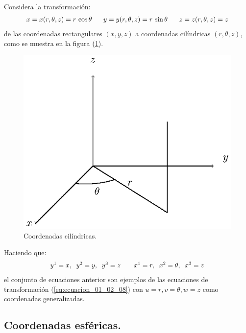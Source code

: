 \documentclass[hidelinks,12pt]{article}
\begin{document}
Considera la transformación:
\begin{align*}
x = x (r, \theta, z) = r \, \cos \theta \hspace{0.6cm} y = y (r, \theta, z) = r \, \sin \theta \hspace{0.6cm} z = z (r, \theta, z) = z
\end{align*}
de las coordenadas rectangulares $(x, y, z)$ a coordenadas cilíndricas $(r, \theta, z)$, como se muestra en la figura (\ref{fig:figura_01_02_02}). 
\begin{figure}[H]
    \centering
    \includegraphics[scale=1]{Imagenes/Sistema_Cilindrico.eps}
    \caption{Coordenadas cilíndricas.}
    \label{fig:figura_01_02_02}
\end{figure}
Haciendo que:
\begin{align*}
y^{1} = x, \hspace{0.2cm} y^{2} = y, \hspace{0.2cm} y^{3} = z \hspace{0.7cm} x^{1} = r, \hspace{0.2cm} x^{2} = \theta, \hspace{0.2cm} x^{3} = z
\end{align*}
el conjunto de ecuaciones anterior son ejemplos de las ecuaciones de transformación (\ref{eq:ecuacion_01_02_08}) con $u = r, v = \theta, w = z$ como coordenadas generalizadas.

\subsection{Coordenadas esféricas.}
\end{document}
